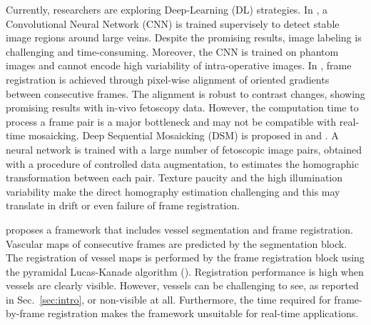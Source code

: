 \documentclass[sn-basic]{sn-jnl}%
\begin{document}
Currently, researchers are exploring Deep-Learning (DL) strategies. In \cite{Gaisser2018}, a Convolutional Neural Network (CNN) is trained supervisely to detect stable image regions around large veins. Despite the promising results, image labeling is challenging and time-consuming. Moreover, the CNN is trained on phantom images and cannot encode high variability of intra-operative images. %
%
In \cite{Loic2018}, frame registration is achieved through pixel-wise alignment of oriented gradients between consecutive frames. The alignment is robust to contrast changes, showing promising results with in-vivo fetoscopy data. However, the computation time to process a frame pair is a major bottleneck and may not be compatible with real-time mosaicking.
%
Deep Sequential Mosaicking (DSM) is proposed in \cite{Bano2019} and \cite{Bano2020}. A neural network is trained with a large number of fetoscopic image pairs, obtained with a procedure of controlled data augmentation, to estimates the homographic transformation between each pair. Texture paucity and the high illumination variability make the direct homography estimation challenging and this may translate in drift or even failure of frame registration.

\cite{BanoMosaicking2020} proposes a framework that includes vessel segmentation and frame registration. Vascular maps of consecutive frames are predicted by the segmentation block. The registration of vessel maps is performed by the frame registration block using the pyramidal Lucas-Kanade algorithm (\cite{LucasKanade1981}). Registration performance is high when vessels are clearly visible. However, vessels can be challenging to see, as reported in Sec.~\ref{sec:intro}, or non-visible at all. Furthermore, the time required for frame-by-frame registration makes the framework unsuitable for real-time applications. 

\end{document}
